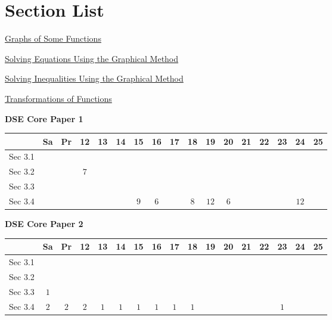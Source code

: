 \documentclass[12pt, a4paper]{article}
\begin{document}
\section*{Section List}
\begin{enumx}[label=Sec 3.\arabic*\ ]
\item \hyperref[section:6-3-1]{Graphs of Some Functions}
\item \hyperref[section:6-3-2]{Solving Equations Using the Graphical Method}
\item \hyperref[section:6-3-3]{Solving Inequalities Using the Graphical Method}
\item \hyperref[section:6-3-4]{Transformations of Functions \NF}
\end{enumx}
\begin{absolutelynopagebreak}
\begin{center}
\textbf{DSE Core Paper 1}
\end{center}
\begin{center}
\begin{tabular}{|l|c|c|c|c|c|c|c|c|c|c|c|c|c|c|c|c|}
\hline
        & Sa & Pr & 12 & 13 & 14 & 15 & 16 & 17 & 18 & 19 & 20 & 21 & 22 & 23 & 24 & 25 \\\hline\hline
Sec 3.1 &  &  &  &  &  &  &  &  &  &  &  &  &  &  &  &  \\\hline
Sec 3.2 &  &  &  $7$ &  &  &  &  &  &  &  &  &  &  &  &  &  \\\hline
Sec 3.3 &  &  &  &  &  &  &  &  &  &  &  &  &  &  &  &  \\\hline
Sec 3.4 &  &  &  &  &  &  $9$ &  $6$ &  &  $8$ &  $12$ &  $6$ &  &  &  &  $12$ &  \\\hline
\end{tabular}
\end{center}
\end{absolutelynopagebreak}
\begin{absolutelynopagebreak}
\begin{center}
\textbf{DSE Core Paper 2}
\end{center}
\begin{center}
\begin{tabular}{|l|c|c|c|c|c|c|c|c|c|c|c|c|c|c|c|c|}
\hline
        & Sa & Pr & 12 & 13 & 14 & 15 & 16 & 17 & 18 & 19 & 20 & 21 & 22 & 23 & 24 & 25 \\\hline\hline
Sec 3.1 &  &  &  &  &  &  &  &  &  &  &  &  &  &  &  &  \\\hline
Sec 3.2 &  &  &  &  &  &  &  &  &  &  &  &  &  &  &  &  \\\hline
Sec 3.3 &  $1$ &  &  &  &  &  &  &  &  &  &  &  &  &  &  &  \\\hline
Sec 3.4 &  $2$ &  $2$ &  $2$ &  $1$ &  $1$ &  $1$ &  $1$ &  $1$ &  $1$ &  &  &  &  &  $1$ &  &  \\\hline
\end{tabular}
\end{center}
\end{absolutelynopagebreak}
\end{document}
